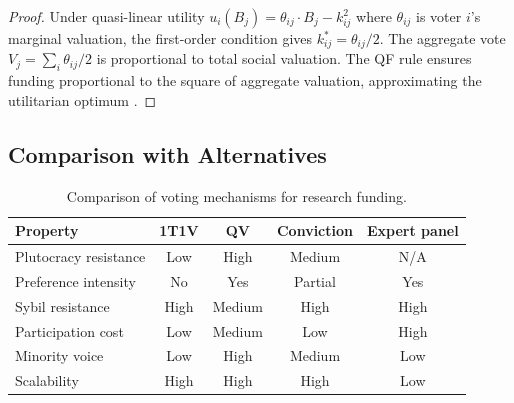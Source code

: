 \begin{proof}
Under quasi-linear utility $u_i(B_j) = \theta_{ij} \cdot B_j -
k_{ij}^2$ where $\theta_{ij}$ is voter $i$'s marginal valuation, the
first-order condition gives $k_{ij}^* = \theta_{ij} / 2$. The aggregate
vote $V_j = \sum_i \theta_{ij} / 2$ is proportional to total social
valuation. The QF rule ensures funding proportional to the square of
aggregate valuation, approximating the utilitarian optimum
\citep{lalley2018quadratic}.
\end{proof}

\subsection{Comparison with Alternatives}

\begin{table}[H]
\centering
\caption{Comparison of voting mechanisms for research funding.}
\label{tab:voting}
\begin{tabular}{p{3cm}cccc}
\toprule
\textbf{Property} & \textbf{1T1V} & \textbf{QV} &
  \textbf{Conviction} & \textbf{Expert panel} \\
\midrule
Plutocracy resistance & Low & High & Medium & N/A \\
Preference intensity & No & Yes & Partial & Yes \\
Sybil resistance & High & Medium & High & High \\
Participation cost & Low & Medium & Low & High \\
Minority voice & Low & High & Medium & Low \\
Scalability & High & High & High & Low \\
\bottomrule
\end{tabular}
\end{table}


